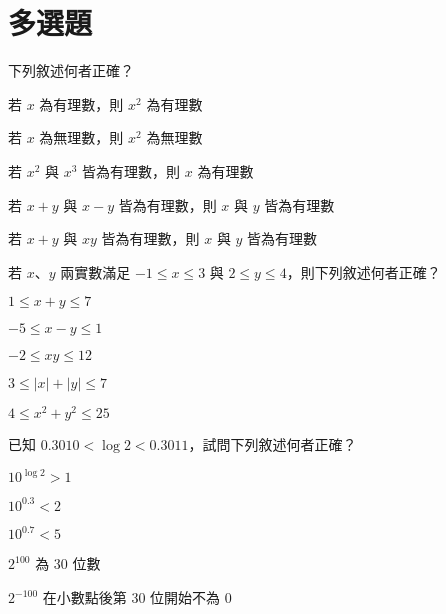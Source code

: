 \documentclass[12pt]{article}
\newenvironment{choices}[1]{\par\NumTabs{#1}\begin{enumerate*}[label=(\Alph*),itemjoin=\tab]}{\end{enumerate*}}
\begin{document}
\section{多選題}
\begin{enumerate}[align=left,leftmargin=*,labelsep=.6em,resume]
  \item 下列敘述何者正確？
  \begin{choices}{1}
    \item 若 $x$ 為有理數，則 $x^2$ 為有理數
    \item 若 $x$ 為無理數，則 $x^2$ 為無理數
    \item 若 $x^2$ 與 $x^3$ 皆為有理數，則 $x$ 為有理數
    \item 若 $x+y$ 與 $x-y$ 皆為有理數，則 $x$ 與 $y$ 皆為有理數
    \item 若 $x+y$ 與 $xy$ 皆為有理數，則 $x$ 與 $y$ 皆為有理數
  \end{choices}
  \item 若 $x$、$y$ 兩實數滿足 $-1 \leq x \leq 3$ 與 $2 \leq y \leq 4$，則下列敘述何者正確？
  \begin{choices}{1}
    \item $1 \leq x + y \leq 7$
    \item $-5 \leq x - y \leq 1$
    \item $-2 \leq xy \leq 12$
    \item $3 \leq \lvert x \rvert + \lvert y \rvert \leq 7$
    \item $4 \leq x^2 + y^2 \leq 25$
  \end{choices}
  \item 已知 $0.3010 < \log 2 < 0.3011$，試問下列敘述何者正確？
  \begin{choices}{1}
    \item $10^{\log 2} > 1$
    \item $10^{0.3} < 2$
    \item $10^{0.7} < 5$
    \item $2^{100}$ 為 30 位數
    \item $2^{-100}$ 在小數點後第 30 位開始不為 0
  \end{choices}
\end{enumerate}

\end{document}
